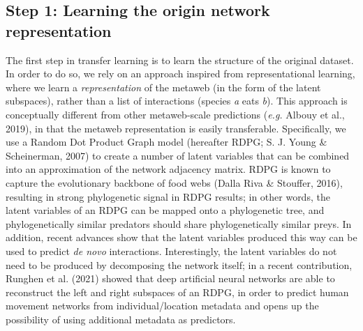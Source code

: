 \documentclass[10pt,oneside]{article}
\begin{document}
\hypertarget{step-1-learning-the-origin-network-representation}{%
\subsection{Step 1: Learning the origin network
representation}\label{step-1-learning-the-origin-network-representation}}

The first step in transfer learning is to learn the structure of the
original dataset. In order to do so, we rely on an approach inspired
from representational learning, where we learn a \emph{representation}
of the metaweb (in the form of the latent subspaces), rather than a list
of interactions (species \emph{a} eats \emph{b}). This approach is
conceptually different from other metaweb-scale predictions (\emph{e.g.}
Albouy et al., 2019), in that the metaweb representation is easily
transferable. Specifically, we use a Random Dot Product Graph model
(hereafter RDPG; S. J. Young \& Scheinerman, 2007) to create a number of
latent variables that can be combined into an approximation of the
network adjacency matrix. RDPG is known to capture the evolutionary
backbone of food webs (Dalla Riva \& Stouffer, 2016), resulting in
strong phylogenetic signal in RDPG results; in other words, the latent
variables of an RDPG can be mapped onto a phylogenetic tree, and
phylogenetically similar predators should share phylogenetically similar
preys. In addition, recent advances show that the latent variables
produced this way can be used to predict \emph{de novo} interactions.
Interestingly, the latent variables do not need to be produced by
decomposing the network itself; in a recent contribution, Runghen et al.
(2021) showed that deep artificial neural networks are able to
reconstruct the left and right subspaces of an RDPG, in order to predict
human movement networks from individual/location metadata and opens up
the possibility of using additional metadata as predictors.
\end{document}
